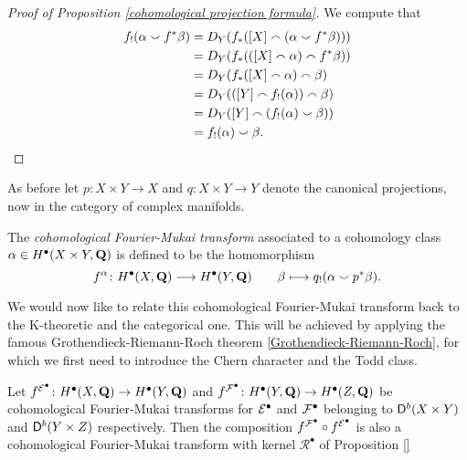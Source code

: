 \begin{proof}[Proof of Proposition \ref{cohomological projection formula}]
    We compute that
    \begin{align*}
        f_!(\alpha \smallsmile f^*\beta) &=
        D_Y(f_*([X] \smallfrown (\alpha \smallsmile f^*\beta))) \\
        &= D_Y(f_*(([X] \smallfrown \alpha) \smallfrown f^*\beta)) \\
        &= D_Y(f_*([X] \smallfrown \alpha) \smallfrown \beta) \\
        &= D_Y(([Y] \smallfrown f_!(\alpha)) \smallfrown \beta) \\
        &= D_Y([Y] \smallfrown (f_!(\alpha) \smallsmile \beta)) \\
        &= f_!(\alpha) \smallsmile \beta. \qedhere
    \end{align*}
\end{proof}

As before let $p \colon X \times Y \to X$ and $q \colon X \times Y \to Y$ denote the canonical projections, now in the category of complex manifolds. 

\begin{definition}
    The \emph{cohomological Fourier-Mukai transform} associated to a cohomology class $\alpha \in H^{\bullet}(X \times Y, \mathbf Q)$ is defined to be the homomorphism
    \[
        f^\alpha \colon H^{\bullet}(X, \mathbf Q) \longrightarrow H^{\bullet}(Y, \mathbf Q) \qquad \beta \longmapsto q_!(\alpha \smallsmile p^*\beta).
    \]
\end{definition}

We would now like to relate this cohomological Fourier-Mukai transform back to the K-theoretic and the categorical one. This will be achieved by applying the famous Grothendieck-Riemann-Roch theorem \ref{Grothendieck-Riemann-Roch}, for which we first need to introduce the Chern character and the Todd class. 

\begin{proposition}
    \label{Composition of cohomological fm is fm}
    Let $f^{\mathcal E^\bullet} \colon H^\bullet(X, \mathbf Q) \to H^\bullet(Y, \mathbf Q)$ and $f^{\mathcal F^\bullet} \colon H^\bullet(Y, \mathbf Q) \to H^\bullet(Z, \mathbf Q)$ be cohomological Fourier-Mukai transforms for $\mathcal E^\bullet$ and $\mathcal F^\bullet$ belonging to $\mathsf{D}^b(X \times Y)$ and $\mathsf{D}^b(Y \times Z)$ respectively. Then the composition $f^{\mathcal F^\bullet} \circ f^{\mathcal E^\bullet}$ is also a cohomological Fourier-Mukai transform with kernel $\mathcal R^\bullet$ of Proposition \ref{}
\end{proposition}

